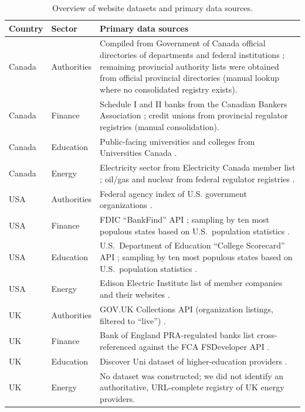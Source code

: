 \documentclass[a4paper,fleqn]{cas-sc}
\begin{document}
\begin{table}[t]
  \caption{Overview of website datasets and primary data sources.}
  \label{tab:dataset_sources}
  \centering
  \scriptsize
  \setlength{\tabcolsep}{3pt}
  \renewcommand{\arraystretch}{1.15}
  \begin{tabularx}{\columnwidth}{l l X}
  \toprule
  Country & Sector & Primary data sources \\
  \midrule
  Canada & Authorities &
  Compiled from Government of Canada official directories of departments and federal institutions
  \cite{canada_depts,canada_institutions}; remaining provincial authority lists were obtained from
  official provincial directories (manual lookup where no consolidated registry exists). \\
  Canada & Finance &
  Schedule I and II banks from the Canadian Bankers Association \cite{cba_member_banks_2024};
  credit unions from provincial regulator registries (manual consolidation). \\
  Canada & Education &
  Public-facing universities and colleges from Universities Canada \cite{ca_unis_list}. \\
  Canada & Energy &
  Electricity sector from Electricity Canada member list \cite{electric_canada_members};
  oil/gas and nuclear from federal regulator registries \cite{cer_pipeline_companies,cnsc_nuclear_facilities}. \\
  \addlinespace[0.4em]
  USA & Authorities &
  Federal agency index of U.S. government organizations \cite{usa-agency-index}. \\
  USA & Finance &
  FDIC ``BankFind'' API \cite{fdic-bankfind-api}; sampling by ten most populous states based on
  U.S.\ population statistics \cite{us-population-stats}. \\
  USA & Education &
  U.S.\ Department of Education ``College Scorecard'' API \cite{us-college-scorecard-docs};
  sampling by ten most populous states based on U.S.\ population statistics \cite{us-population-stats}. \\
  USA & Energy &
  Edison Electric Institute list of member companies and their websites \cite{edison-electric-member-sites}. \\
  \addlinespace[0.4em]
  UK & Authorities &
  GOV.UK Collections API (organization listings, filtered to ``live'') \cite{uk-gov-collections-api-docs}. \\
  UK & Finance &
  Bank of England PRA-regulated banks list \cite{uk-pra-creditunions-list} cross-referenced against
  the FCA FSDeveloper API \cite{uk-fca-api-docs}. \\
  UK & Education &
  Discover Uni dataset of higher-education providers \cite{hesa_discoveruni_2024}. \\
  UK & Energy &
  No dataset was constructed; we did not identify an authoritative, URL-complete registry of UK energy providers. \\
  \bottomrule
  \end{tabularx}
\end{table}
\end{document}
